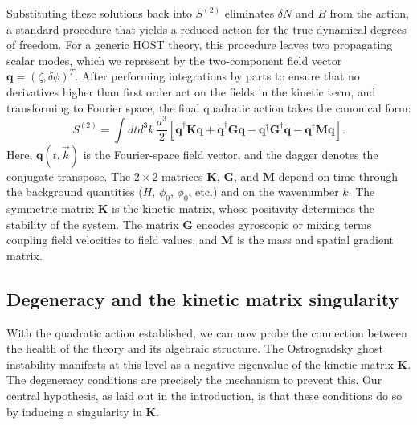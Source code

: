\documentclass[twocolumn]{aastex631}
\begin{document}
Substituting these solutions back into $S^{(2)}$ eliminates $\delta N$ and $B$ from the action, a standard procedure that yields a reduced action for the true dynamical degrees of freedom. For a generic HOST theory, this procedure leaves two propagating scalar modes, which we represent by the two-component field vector $\mathbf{q} = (\zeta, \delta\phi)^T$. After performing integrations by parts to ensure that no derivatives higher than first order act on the fields in the kinetic term, and transforming to Fourier space, the final quadratic action takes the canonical form:
\begin{equation}
S^{(2)} = \int dt d^3k \, \frac{a^3}{2} \left[ \dot{\mathbf{q}}^\dagger \mathbf{K} \dot{\mathbf{q}} + \dot{\mathbf{q}}^\dagger \mathbf{G} \mathbf{q} - \mathbf{q}^\dagger \mathbf{G}^\dagger \dot{\mathbf{q}} - \mathbf{q}^\dagger \mathbf{M} \mathbf{q} \right].
\label{eq:S2}
\end{equation}
Here, $\mathbf{q}(t, \vec{k})$ is the Fourier-space field vector, and the dagger denotes the conjugate transpose. The $2 \times 2$ matrices $\mathbf{K}$, $\mathbf{G}$, and $\mathbf{M}$ depend on time through the background quantities ($H$, $\phi_0$, $\dot{\phi}_0$, etc.) and on the wavenumber $k$. The symmetric matrix $\mathbf{K}$ is the kinetic matrix, whose positivity determines the stability of the system. The matrix $\mathbf{G}$ encodes gyroscopic or mixing terms coupling field velocities to field values, and $\mathbf{M}$ is the mass and spatial gradient matrix.

\subsection{Degeneracy and the kinetic matrix singularity}
With the quadratic action established, we can now probe the connection between the health of the theory and its algebraic structure. The Ostrogradsky ghost instability manifests at this level as a negative eigenvalue of the kinetic matrix $\mathbf{K}$. The degeneracy conditions are precisely the mechanism to prevent this. Our central hypothesis, as laid out in the introduction, is that these conditions do so by inducing a singularity in $\mathbf{K}$.
\end{document}
